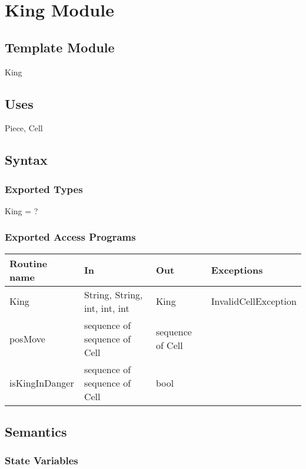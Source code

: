 \documentclass[12pt]{article}
\begin{document}
\section* {King Module}

\subsection*{Template Module}

King

\subsection* {Uses}

Piece, Cell

\subsection* {Syntax}

\subsubsection* {Exported Types}

King = ?

\subsubsection* {Exported Access Programs}

\begin{tabular}{| l | l | l | l |}
\hline
\textbf{Routine name} & \textbf{In} & \textbf{Out} & \textbf{Exceptions}\\
\hline
King &String, String, int, int, int & King & InvalidCellException\\
\hline
posMove & sequence of sequence of Cell & sequence of Cell & ~\\
\hline
isKingInDanger & sequence of sequence of Cell & bool & ~\\
\hline
\end{tabular}

\subsection* {Semantics}

\subsubsection* {State Variables}
\end{document}
